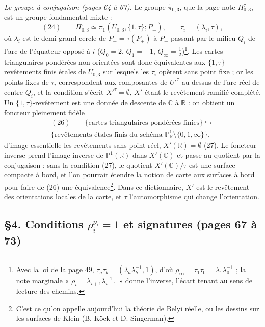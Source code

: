 \documentclass[11pt,a4paper]{article}
\begin{document}
\emph{Le groupe à conjugaison (pages 64 à 67).} Le groupe $\tilde\pi_{0,3}$,
que la page note $\Pi^{\tau}_{0,3}$, est un groupe fondamental mixte :
\[
(24)\qquad \Pi^{\tau}_{0,3} \simeq \pi_1(U_{0,3}, \{1, \tau\}; P_+), \qquad \tau_i = (\lambda_i, \tau),
\]
où $\lambda_i$ est le demi-grand cercle de $P_- = \tau(P_+)$ à $P_+$ passant
par le milieu $Q_i$ de l'arc de l'équateur opposé à $i$ ($Q_0 = 2$,
$Q_1 = -1$, $Q_\infty = \tfrac12$)\footnote{Avec la loi de la page 49,
$\tau_a\tau_b = (\lambda_a\lambda_b^{-1}, 1)$, d'où
$\rho_\infty = \tau_1\tau_0 = \lambda_1\lambda_0^{-1}$ ; la note marginale
« $\rho_i = \lambda_{i+1}\lambda_{i-1}^{-1}$ » donne l'inverse, l'écart tenant
au sens de lecture des chemins.}. Les cartes triangulaires pondérées non
orientées sont donc équivalentes aux $\{1, \tau\}$-revêtements finis étales de
$U_{0,3}$ sur lesquels les $\tau_i$ opèrent sans point fixe ; or les points
fixes de $\tau_i$ correspondent aux composantes de $U'^{\tau}$ au-dessus de
l'arc réel de centre $Q_i$, et la condition s'écrit $X'^{\tau} = \emptyset$,
$X'$ étant le revêtement ramifié complété. Un $\{1, \tau\}$-revêtement est une
donnée de descente de $\mathbb{C}$ à $\mathbb{R}$ : on obtient un foncteur
pleinement fidèle
\[
\begin{gathered}
(26)\qquad \{\text{cartes triangulaires pondérées finies}\} \hookrightarrow \\
\{\text{revêtements étales finis du schéma } \mathbb{P}^1_{\mathbb{R}} \setminus \{0, 1, \infty\}\},
\end{gathered}
\]
d'image essentielle les revêtements sans point réel, $X'(\mathbb{R}) = \emptyset$
(27). Le foncteur inverse prend l'image inverse de $\mathbb{P}^1(\mathbb{R})$ dans
$X'(\mathbb{C})$ et passe au quotient par la conjugaison ; sans la condition
(27), le quotient $X'(\mathbb{C})/\tau$ est une surface compacte à bord, et l'on
pourrait étendre la notion de carte aux surfaces à bord pour faire de (26) une
équivalence\footnote{C'est ce qu'on appelle aujourd'hui la théorie de Belyi
réelle, ou les dessins sur les surfaces de Klein (B. Köck et D. Singerman).}.
Dans ce dictionnaire, $X'$ est le revêtement des orientations locales de la
carte, et $\tau$ l'automorphisme qui change l'orientation.

\subsection*{§4. Conditions $\rho_i^{\nu_i} = 1$ et signatures (pages 67 à 73)}
\end{document}
